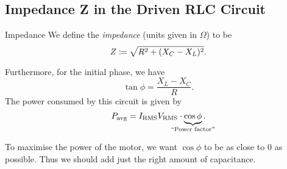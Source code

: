 \documentclass[class=article, crop=false]{standalone}
\begin{document}
  \subsection{Impedance Z in the Driven RLC Circuit}
  \begin{definition}{Impedance}
    We define the \emph{impedance} (units given in $\Omega$) to be
    \[
      Z\coloneqq \sqrt{R^2 + (X_C - X_L)^2}.
    \]
  \end{definition}
  Furthermore, for the initial phase, we have
  \[
    \tan\phi = \frac{X_L-X_C}{R}.
  \]
  The power consumed by this circuit is given by
  \[
    P_\text{avg} = I_\text{RMS}V_\text{RMS}\cdot \underbrace{\cos\phi}_{\mathclap{\text{``Power factor''}}}.
  \]
  \begin{note}{}
    To maximise the power of the motor, we want $\cos\phi$ to be as close to $0$ as possible. Thus we should add just the right amount of capacitance.
  \end{note}
\end{document}
